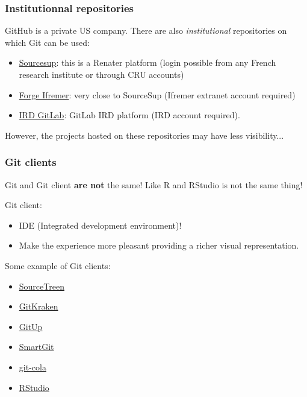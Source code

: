 \documentclass[svgnames]{beamer}
\begin{document}
\begin{frame}
    \frametitle{Institutionnal repositories}

    GitHub is a private US company. There are also \emph{institutional} repositories on which Git can be used:

    \begin{itemize}
        \item{\href{https://sourcesup.renater.fr/}{Sourcesup}: this is a Renater platform (login possible from any French research institute or through CRU accounts)}
        \item{\href{https://forge.ifremer.fr/}{Forge Ifremer}: very close to SourceSup (Ifremer extranet account required)}
        \item{\href{gitlab.intranet.ird.fr}{IRD GitLab}: GitLab IRD platform (IRD account required).}
    \end{itemize}

    However, the projects hosted on these repositories may have less visibility...

\end{frame}


\begin{frame}
    \frametitle{Git clients}

    Git and Git client \textbf{are not} the same! Like R and RStudio is not the same thing!
    \hfill \break

    Git client:
    \begin{itemize}
        \item IDE (Integrated development environment)!
        \item Make the experience more pleasant providing a richer visual representation.
    \end{itemize}

    \hfill 

    Some example of Git clients:
    \begin{itemize}
        \item \href{https://www.sourcetreeapp.com/}{ SourceTreen} 
        \item \href{https://www.gitkraken.com/}{ GitKraken}
        \item \href{https://gitup.co/}{ GitUp} 
        \item \href{https://www.syntevo.com/smartgit/}{ SmartGit} 
        \item \href{https://git-cola.github.io/}{ git-cola} 
        \item \href{https://www.rstudio.com/}{ RStudio}
    \end{itemize}

    \vspace{3em}

\end{frame}
\end{document}
